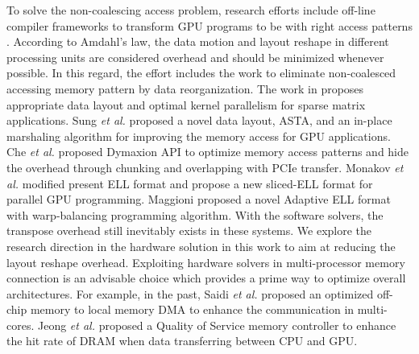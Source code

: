 \documentclass[10pt,journal,compsoc]{IEEEtran}
\begin{document}



To solve the non-coalescing access problem,
research efforts include off-line compiler frameworks to transform GPU programs
to be with  right access patterns \cite{AffineLoop}.
According to Amdahl's law,
the data motion and layout reshape in different processing units are considered
overhead and should be minimized whenever possible.
In this regard, the effort includes the work
to eliminate non-coalesced accessing memory pattern by data reorganization.
The work in \cite{ModelDrivenSpMV}\cite{AutoSpMV}
proposes appropriate data layout and optimal kernel parallelism for sparse matrix applications.
Sung \textit{et al.} \cite{ASTA} proposed a novel data layout, ASTA,
and an in-place marshaling algorithm for
 improving the memory access for GPU applications.
Che \textit{et al.} \cite{Dymaxion} proposed Dymaxion API to
optimize memory access patterns and hide the overhead through chunking
and overlapping with PCIe transfer.
Monakov \textit{et al.} \cite{AutoSpMV} modified present ELL format and propose a new sliced-ELL format for parallel GPU programming.
Maggioni \cite{AdELL} proposed a novel Adaptive ELL format with warp-balancing programming algorithm.
With the software solvers, the transpose overhead still inevitably exists in these systems.
We explore the research direction in the hardware solution
in this work to aim at reducing the layout reshape overhead.
Exploiting hardware solvers in multi-processor memory connection is an
advisable choice which provides a prime way to optimize
overall architectures.
For example, in the past, Saidi \textit{et al.} \cite{Cell} proposed an
optimized off-chip memory
to local memory DMA to enhance the communication in multi-cores.
Jeong \textit{et al.} \cite{QoS-Aware} proposed a Quality of Service
memory controller to enhance the hit rate of DRAM when data transferring
between CPU and GPU.
\end{document}
